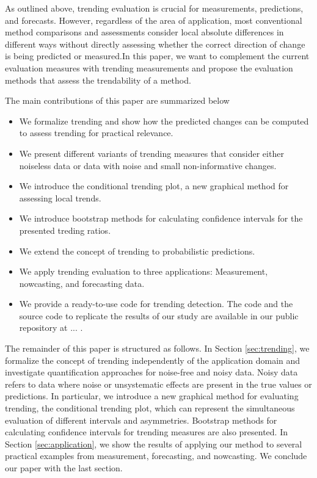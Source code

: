 As outlined above, trending evaluation is crucial for measurements, predictions, and forecasts. 
However, regardless of the area of application, most conventional method comparisons and assessments consider local absolute differences in different ways without directly assessing whether the correct direction of change is being predicted or measured.In this paper, we want to complement the current evaluation measures with trending measurements and propose the evaluation methods that assess the trendability of a method.

The main contributions of this paper are summarized below
\begin{itemize}
\item We formalize trending and show how the predicted changes can be computed to assess trending for practical relevance. 
\item We present different variants of trending measures that consider either noiseless data or data with noise and small non-informative changes.
\item We introduce the conditional trending plot, a new graphical method for assessing local trends.
\item We introduce bootstrap methods for calculating confidence intervals for the presented treding ratios.
\item We extend the concept of trending to probabilistic predictions.
\item We apply trending evaluation to three applications: Measurement, nowcasting, and forecasting data. 
\item We provide a ready-to-use code for trending detection. The code and the source code to replicate the results of our study are available in our public repository at ... .
\end{itemize}

The remainder of this paper is structured as follows. 
In Section \ref{sec:trending}, we formalize the concept of trending independently of the application domain and investigate quantification approaches for noise-free and noisy data. Noisy data refers to data where noise or unsystematic effects are present in the true values or predictions.
In particular, we introduce a new graphical method for evaluating trending, the conditional trending plot, which can represent the simultaneous evaluation of different intervals and asymmetries. 
Bootstrap methods for calculating confidence intervals for trending measures are also presented. 
In Section \ref{sec:application}, we show the results of applying our method to several practical examples from measurement, forecasting, and nowcasting. 
We conclude our paper with the last section.
